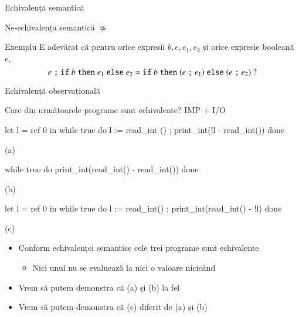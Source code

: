 \documentclass[xcolor=pdftex,romanian,colorlinks]{beamer}
\begin{document}
\begin{section}{Echivalență semantică}
\begin{frame}{Ne-echivalența semantică $\not\simeq$}
\begin{block}{Exemplu}
E adevărat că pentru orice expresii $b, e, e_1, e_2$ și orice expresie booleană $e$,
\[{ e \mathrel{\text{\ttfamily ;}}{\mathrel{\text{\ttfamily if}} b \mathrel{\text{\ttfamily then}} e_1 \mathrel{\text{\ttfamily else}} e_2}}  \simeq {\ensuremath\mathrel{\text{\ttfamily if}}b \ensuremath\mathrel{\text{\ttfamily then}}(e \ensuremath\mathrel{\text{\ttfamily ;}} e_1) \ensuremath\mathrel{\text{\ttfamily else}}(e \ensuremath\mathrel{\text{\ttfamily ;}} e_2)}\mbox{ ?}\]
\end{block}
\end{frame}

\end{section}

\begin{section}{Echivalență observațională}

\begin{frame}[fragile]{Care din următoarele programe sunt echivalente?}
{IMP + I/O}
\begin{block}{}
\hfill\begin{minipage}[t]{.3\columnwidth}
\begin{asciiml}
let l = ref 0 in
while true do 
 l := read_int () ;
 print_int(!l 
         - read_int())
done

      (a)
\end{asciiml}
\end{minipage}
\hfill\begin{minipage}[t]{.3\columnwidth}
\begin{asciiml}
while true do 
  print_int(read_int() 
          - read_int())
done


      (b)
\end{asciiml}
\end{minipage}
\hfill\begin{minipage}[t]{.3\columnwidth}
\begin{asciiml}
let l = ref 0 in
while true do 
  l := read_int() ;
  print_int(read_int() 
          - !l)
done

      (c)
\end{asciiml}
\end{minipage}
\end{block}

\begin{itemize}
\item Conform echivalenței semantice cele trei programe sunt echivalente
\begin{itemize}
\item Nici unul nu se evaluează la nici o valoare nicicând
\end{itemize}
\item Vrem să putem demonstra că (a) și (b)  la fel
\item Vrem să putem demonstra că (c)  diferit de (a) și (b)
\end{itemize}
\end{frame}


\end{section}
\end{document}
